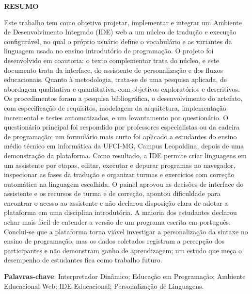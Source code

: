 \documentclass[
        oneside,      %
        english,
        brazil
        ]{configcefetmglpd}
\begin{document}

\begin{resumo_cefetmg}

\begin{center}
    \textbf{RESUMO}
\end{center}


\noindent Este trabalho tem como objetivo projetar, implementar e integrar um Ambiente de Desenvolvimento Integrado (IDE) web a um núcleo de tradução e execução configurável, no qual o próprio usuário define o vocabulário e as variantes da linguagem usada no ensino introdutório de programação. O projeto foi desenvolvido em coautoria: o texto complementar trata do núcleo, e este documento trata da interface, do assistente de personalização e dos fluxos educacionais. Quanto à metodologia, trata-se de uma pesquisa aplicada, de abordagem qualitativa e quantitativa, com objetivos exploratórios e descritivos. Os procedimentos foram a pesquisa bibliográfica, o desenvolvimento do artefato, com especificação de requisitos, modelagem da arquitetura, implementação incremental e testes automatizados, e um levantamento por questionário. O questionário principal foi respondido por professores especialistas ou da cadeira de programação; um formulário mais curto foi aplicado a estudantes do ensino médio técnico em informática da UFCI-MG, Campus Leopoldina, depois de uma demonstração da plataforma. Como resultado, a IDE permite criar linguagens em um assistente por etapas, editar, executar e depurar programas no navegador, inspecionar as fases da tradução e organizar turmas e exercícios com correção automática na linguagem escolhida. O painel aprovou as decisões de interface do assistente e os recursos de turma e de correção, apontou dificuldade para encontrar o acesso ao assistente e não declarou disposição clara de adotar a plataforma em uma disciplina introdutória. A maioria dos estudantes declarou achar mais fácil de entender a versão de um programa escrita em português. Conclui-se que a plataforma torna viável investigar a personalização da sintaxe no ensino de programação, mas os dados coletados registram a percepção dos participantes e não demonstram ganho de aprendizagem; um estudo que meça o desempenho de estudantes fica como trabalho futuro.


\noindent
\textbf{Palavras-chave}: Interpretador Dinâmico; Educação em Programação; Ambiente Educacional Web; IDE Educacional; Personalização de Linguagens.

\end{resumo_cefetmg}
\end{document}
